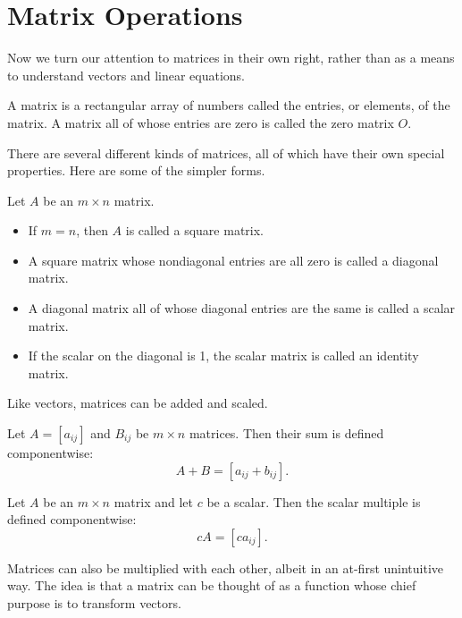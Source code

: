 \documentclass[../m73main.tex]{chapters}
\begin{document}
\section{Matrix Operations}
Now we turn our attention to matrices in their own right, rather than as a means to understand vectors and linear equations.

\begin{definition}[Matrix]
	A matrix is a rectangular array of numbers called the entries, or elements, of the matrix.
	A matrix all of whose entries are zero is called the zero matrix $O$.
\end{definition}

There are several different kinds of matrices, all of which have their own special properties.
Here are some of the simpler forms.

\begin{definition}
	Let $A$ be an $m \times n$ matrix.
	\begin{itemize}
		\item If $ m =n$, then $A$ is called a square matrix.
		\item A square matrix whose nondiagonal entries are all zero is called a diagonal matrix.
		\item A diagonal matrix all of whose diagonal entries are the same is called a scalar matrix.
		\item If the scalar on the diagonal is 1, the scalar matrix is called an identity matrix.
	\end{itemize}
\end{definition}

Like vectors, matrices can be added and scaled.

\begin{definition}
	Let $A = [a_{ij}]$ and $B_{ij}$ be $m \times n$ matrices.
	Then their sum is defined componentwise:
	\[ A + B = [a_{ij} + b_{ij}]. \]
\end{definition}

\begin{definition}
	Let $A$ be an $m\times n$ matrix and let $c$ be a scalar.
	Then the scalar multiple is defined componentwise:
	\[ cA = [ca_{ij}]. \]
\end{definition}

Matrices can also be multiplied with each other, albeit in an at-first unintuitive way.
The idea is that a matrix can be thought of as a function whose chief purpose is to transform vectors.
\end{document}

